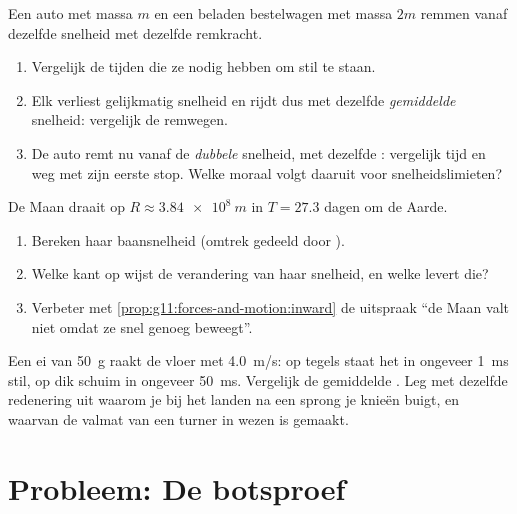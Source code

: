 \begin{exercise}[$\star\star\star$]\label{exo:g11:forces-and-motion:13}
Een auto met massa $m$ en een beladen bestelwagen met massa $2m$ remmen
vanaf dezelfde snelheid met dezelfde remkracht.
\begin{enumerate}
  \item Vergelijk de tijden die ze nodig hebben om stil te staan.
  \item Elk verliest gelijkmatig snelheid en rijdt dus met dezelfde
        \emph{gemiddelde} snelheid: vergelijk de remwegen.
  \item De auto remt nu vanaf de \emph{dubbele} snelheid, met dezelfde
        : vergelijk tijd en weg met zijn eerste stop. Welke moraal
        volgt daaruit voor snelheidslimieten?
\end{enumerate}
\end{exercise}

\begin{exercise}[$\star\star\star$]\label{exo:g11:forces-and-motion:14}
De Maan draait op $R \approx \qty{3.84e8}{m}$ in $T = \num{27.3}$ dagen
om de Aarde.
\begin{enumerate}
  \item Bereken haar baansnelheid (omtrek gedeeld door ).
  \item Welke kant op wijst de verandering van haar snelheid, en welke
         levert die?
  \item Verbeter met \cref{prop:g11:forces-and-motion:inward} de uitspraak
        ``de Maan valt niet omdat ze snel genoeg beweegt''.
\end{enumerate}
\end{exercise}

\begin{exercise}[$\star\star\star$]\label{exo:g11:forces-and-motion:15}
Een ei van \qty{50}{g} raakt de vloer met \qty{4.0}{m/s}: op tegels staat
het in ongeveer \qty{1}{ms} stil, op dik schuim in ongeveer \qty{50}{ms}.
Vergelijk de gemiddelde . Leg met dezelfde redenering uit waarom
je bij het landen na een sprong je knieën buigt, en waarvan de valmat van
een turner in wezen is gemaakt.
\end{exercise}

\section{Probleem: De botsproef}


